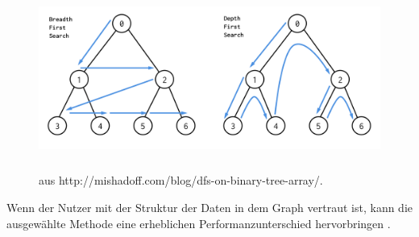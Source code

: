 \FloatBarrier
\begin{figure}[!htb]
	\centering
	\includegraphics [width=14cm, height=6cm]{Figures/search}
	\caption[Breiten- und Tiefensuche]{ aus http://mishadoff.com/blog/dfs-on-binary-tree-array/.}
	\label{fig:Search}
\end{figure} 
\FloatBarrier
Wenn der Nutzer mit der Struktur der Daten in dem Graph vertraut ist, kann die ausgewählte Methode eine erheblichen Performanzunterschied  hervorbringen \parencite{vukotic2015neo4j}. 

